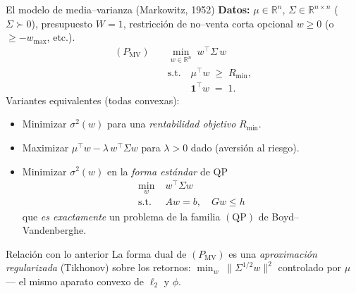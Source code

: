 \documentclass[10pt,aspectratio=169]{beamer}
\newcommand{\R}{\mathbb{R}}
\newcommand{\0}{\mathbf{0}}
\newcommand{\1}{\mathbf{1}}
\begin{document}
\begin{frame}{El modelo de media--varianza (Markowitz, 1952)}
  \textbf{Datos:} $\mu\in\R^n$, $\Sigma\in\R^{n\times n}$ ($\Sigma\succ0$),
  presupuesto $W=1$, restricción de no--venta corta opcional
  $w\ge0$ (o $\ge -w_{\max}$, etc.).
  \[
    \boxed{
      \begin{array}{rl}
        (P_{\mathrm{MV}}) \quad & \min\limits_{w\in\R^n}\; w^{\top}\Sigma\, w \\[2pt]
                               & \text{s.t.}\quad \mu^{\top} w \;\ge\; R_{\min}, \\[2pt]
                               & \phantom{\text{s.t.}}\quad \mathbf{1}^{\top} w \;=\; 1.
      \end{array}}
  \]
  Variantes equivalentes (todas convexas):
  \begin{itemize}
    \item Minimizar $\sigma^2(w)$ para una \emph{rentabilidad objetivo} $R_{\min}$.
    \item Maximizar $\mu^{\top} w - \lambda\,w^{\top}\Sigma w$ para
          $\lambda>0$ dado (aversión al riesgo).
    \item Minimizar $\sigma^2(w)$ en la \emph{forma estándar} de QP
          \[
            \begin{array}{rl}
              \min\limits_{w}\;& w^{\top}\Sigma w \\
              \text{s.t.}\;& A w = b,\quad G w \le h
            \end{array}
          \]
          que \emph{es exactamente} un problema de la familia
          $(\mathrm{QP})$ de Boyd--Vandenberghe.
  \end{itemize}
  \begin{exampleblock}{Relación con lo anterior}
    La forma dual de $(P_{\mathrm{MV}})$ es una \emph{aproximación
    regularizada} (Tikhonov) sobre los retornos:
    $\min_w\;\|\Sigma^{1/2}w\|^2$ controlado por $\mu$ ---
    el mismo aparato convexo de $\ell_2$ y $\phi$.
  \end{exampleblock}
\end{frame}
\end{document}
